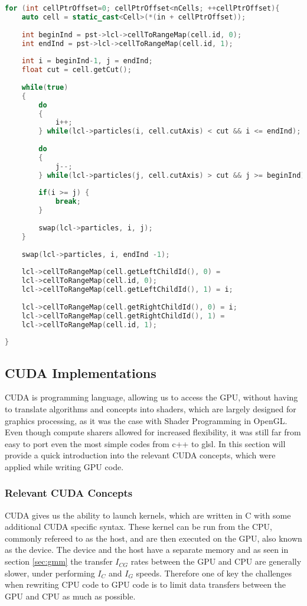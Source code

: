 \documentclass[]{article}
\begin{document}
\begin{lstlisting}[language=c++]
for (int cellPtrOffset=0; cellPtrOffset<nCells; ++cellPtrOffset){
	auto cell = static_cast<Cell>(*(in + cellPtrOffset));
	
	int beginInd = pst->lcl->cellToRangeMap(cell.id, 0);
	int endInd = pst->lcl->cellToRangeMap(cell.id, 1);
	
	int i = beginInd-1, j = endInd;
	float cut = cell.getCut();
	
	while(true)
	{
		do
		{
			i++;
		} while(lcl->particles(i, cell.cutAxis) < cut && i <= endInd);
		
		do
		{
			j--;
		} while(lcl->particles(j, cell.cutAxis) > cut && j >= beginInd);
		
		if(i >= j) {
			break;
		}
		
		swap(lcl->particles, i, j);
	}
	
	swap(lcl->particles, i, endInd -1);
	
	lcl->cellToRangeMap(cell.getLeftChildId(), 0) =
	lcl->cellToRangeMap(cell.id, 0);
	lcl->cellToRangeMap(cell.getLeftChildId(), 1) = i;
	
	lcl->cellToRangeMap(cell.getRightChildId(), 0) = i;
	lcl->cellToRangeMap(cell.getRightChildId(), 1) =
	lcl->cellToRangeMap(cell.id, 1);
	
}
\end{lstlisting}

\subsection{CUDA Implementations}

CUDA is programming language, allowing us to access the GPU, without having to translate algorithms and concepts into shaders, which are largely designed for graphics processing, as it was the case with Shader Programming in OpenGL. Even though compute sharers allowed for increased flexibility, it was still far from easy to port even the most simple codes from c++ to glsl. In this section will provide a quick introduction into the relevant CUDA concepts, which were applied while writing GPU code.

\subsubsection{Relevant CUDA Concepts}

CUDA gives us the ability to launch kernels, which are written in C with some additional CUDA specific syntax. These kernel can be run from the CPU, commonly refereed to as the host, and are then executed on the GPU, also known as the device. The device and the host have a separate memory and as seen in section \ref{sec:gmm} the transfer $I_{CG}$ rates between the GPU and CPU are generally slower, under performing $I_{C}$ and $I_G$ speeds. Therefore one of key the challenges when rewriting CPU code to GPU code is to limit data transfers between the GPU and CPU as much as possible.
\end{document}
